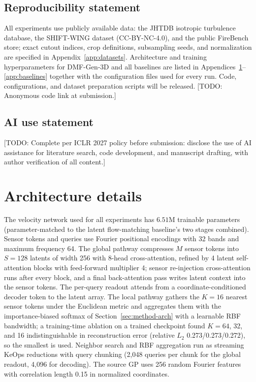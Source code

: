 \documentclass{article} %
\newcommand{\todo}[1]{{\color{red}[TODO: #1]}}
\newcommand{\model}{DMF-Gen-3D}
\begin{document}
\label{endconclusion}
\subsection*{Reproducibility statement}
All experiments use publicly available data: the JHTDB isotropic turbulence database, the SHIFT-WING dataset (CC-BY-NC-4.0), and the public FireBench store; exact cutout indices, crop definitions, subsampling seeds, and normalization are specified in Appendix~\ref{app:datasets}. Architecture and training hyperparameters for \model{} and all baselines are listed in Appendices~\ref{app:architecture}--\ref{app:baselines} together with the configuration files used for every run. Code, configurations, and dataset preparation scripts will be released. \todo{Anonymous code link at submission.}

\subsection*{AI use statement}
\todo{Complete per ICLR 2027 policy before submission: disclose the use of AI assistance for literature search, code development, and manuscript drafting, with author verification of all content.}




\appendix

\section{Architecture details}
\label{app:architecture}

The velocity network used for all experiments has $6.51$M trainable parameters (parameter-matched to the latent flow-matching baseline's two stages combined). Sensor tokens and queries use Fourier positional encodings with 32 bands and maximum frequency 64. The global pathway compresses $M$ sensor tokens into $S{=}128$ latents of width 256 with 8-head cross-attention, refined by 4 latent self-attention blocks with feed-forward multiplier 4; sensor re-injection cross-attention runs after every block, and a final back-attention pass writes latent context into the sensor tokens. The per-query readout attends from a coordinate-conditioned decoder token to the latent array. The local pathway gathers the $K{=}16$ nearest sensor tokens under the Euclidean metric and aggregates them with the importance-biased softmax of Section~\ref{sec:method-arch} with a learnable RBF bandwidth; a training-time ablation on a trained checkpoint found $K{=}64$, 32, and 16 indistinguishable in reconstruction error (relative $L_2$ 0.273/0.273/0.272), so the smallest is used. Neighbor search and RBF aggregation run as streaming KeOps reductions \citep{charlier2021kernel} with query chunking (2{,}048 queries per chunk for the global readout, 4{,}096 for decoding). The source GP uses 256 random Fourier features with correlation length 0.15 in normalized coordinates.
\end{document}
